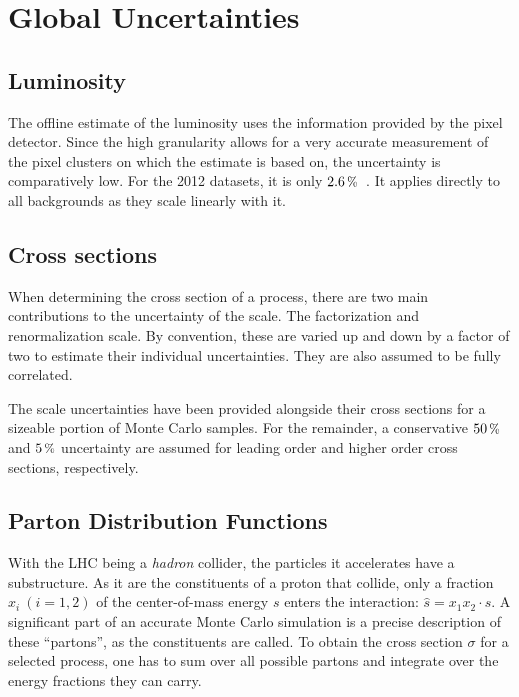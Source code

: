 \section{Global Uncertainties}
\label{sec:glblsys}

\subsection{Luminosity}
\label{sec:lumisys}

The offline estimate of the luminosity uses the information provided by the pixel detector. Since the high granularity allows for a very accurate measurement of the pixel clusters on which the estimate is based on, the uncertainty is comparatively low. For the 2012 datasets, it is only $2.6\,\pct$~\cite{lumisys}. It applies directly to all backgrounds as they scale linearly with it.


\subsection{Cross sections}
\label{sec:xssys}

When determining the cross section of a process, there are two main contributions to the uncertainty of the scale. The factorization and renormalization scale. By convention, these are varied up and down by a factor of two to estimate their individual uncertainties. They are also assumed to be fully correlated.

The scale uncertainties have been provided alongside their cross sections for a sizeable portion of Monte Carlo samples. For the remainder, a conservative $50\,\pct$ and $5\,\pct$ uncertainty are assumed for leading order and higher order cross sections, respectively.


\subsection{Parton Distribution Functions}
\label{sec:pdfsys}

With the LHC being a \textit{hadron} collider, the particles it accelerates have a substructure. As it are the constituents of a proton that collide, only a fraction $x_i \: (i = 1,2)$ of the center-of-mass energy $s$ enters the interaction: $\hat{s} = x_1 x_2 \cdot s$. A significant part of an accurate Monte Carlo simulation is a precise description of these ``partons'', as the constituents are called. To obtain the cross section $\sigma$ for a selected process, one has to sum over all possible partons and integrate over the energy fractions they can carry.


